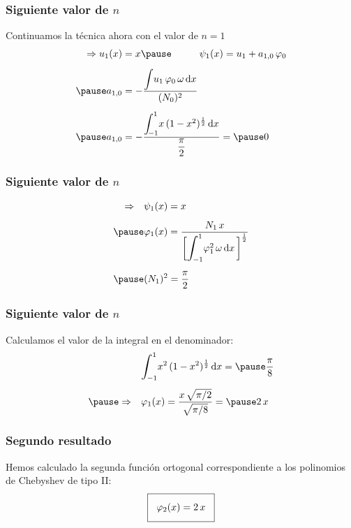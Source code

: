 \documentclass[12pt]{beamer}
\begin{document}
\begin{frame}
\frametitle{Siguiente valor de $n$}
Continuamos la técnica ahora con el valor de $n = 1$
\pause
\begin{eqnarray*}
\begin{aligned}
\Rightarrow u_{1} (x) &= x \pause \hspace{1cm} \psi_{1} (x) =  u_{1} + a_{1,0} \, \varphi_{0} \\[0.5em] \pause
a_{1,0} &= - \dfrac{\scaleint{5ex} u_{1} \, \varphi_{0} \, \omega \dd{x}}{(N_{0})^{2}} \\[0.5em] \pause
a_{1,0} &= - \dfrac{\scaleint{5ex}_{\bs -1}^{1} x \, (1 - x^{2})^{\frac{1}{2}} \dd{x}}{\dfrac{\pi}{2}} = \pause 0
\end{aligned}
\end{eqnarray*}    
\end{frame}
\begin{frame}
\frametitle{Siguiente valor de $n$}
\begin{eqnarray*}
\begin{aligned}
\Rightarrow \quad &\psi_{1} (x) =  x \\[0.5em] \pause
&\varphi_{1} (x) = \dfrac{N_{1} \, x}{\bigg[ \scaleint{6ex}_{\bs -1}^{1} \varphi_{1}^{2} \, \omega \dd{x} \bigg]^{\frac{1}{2}}} \\[0.5em] \pause
&(N_{1})^{2} = \dfrac{\pi}{2}
\end{aligned}
\end{eqnarray*}    
\end{frame}
\begin{frame}
\frametitle{Siguiente valor de $n$}
Calculamos el valor de la integral en el denominador:
\pause
\begin{eqnarray*}
\begin{aligned}
&\scaleint{6ex}_{\bs -1}^{1} x^{2} \, (1 - x^{2})^{\frac{1}{2}} \dd{x} = \pause \dfrac{\pi}{8} \\[0.4em] \pause
\Rightarrow \quad &\varphi_{1} (x) = \dfrac{x \, \sqrt{\pi/2}}{\sqrt{\pi/8}} = \pause 2 \, x
\end{aligned}
\end{eqnarray*}    
\end{frame}
\begin{frame}
\frametitle{Segundo resultado}
Hemos calculado la segunda función ortogonal correspondiente a los polinomios de Chebyshev de tipo II:
\pause
\begin{align*}
\setlength{\fboxsep}{3\fboxsep}\boxed{
\varphi_{2} (x) = 2 \, x}
\end{align*}
\end{frame}
\end{document}
